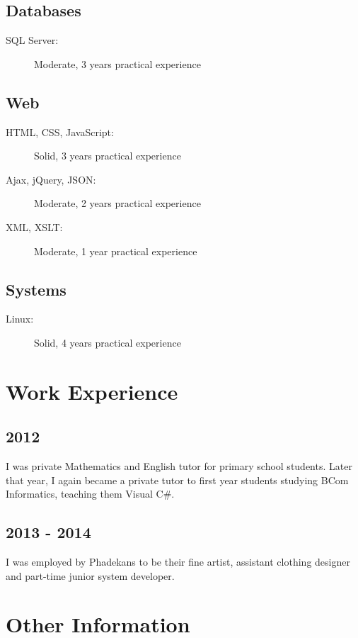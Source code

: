 	\subsection*{Databases}
		\begin{description}
			\item[SQL Server:]Moderate, 3 years practical experience
		\end{description}
	\subsection*{Web}
		\begin{description}
			\item [HTML, CSS, JavaScript:] Solid, 3 years practical experience
			\item [Ajax, jQuery, JSON:] Moderate, 2 years practical experience
			\item [XML, XSLT:] Moderate, 1 year practical experience
		\end{description}
	\subsection*{Systems}
		\begin{description}
			\item [Linux:] Solid, 4 years practical experience
		\end{description}
	


\section*{Work Experience}

	\subsection*{2012}
	I was private Mathematics and English tutor for primary school students. Later that year, I again became a private tutor to first year students studying BCom Informatics, teaching them Visual C\#.
	\subsection*{2013 - 2014}
	I was employed by Phadekans to be their fine artist, assistant clothing designer and part-time junior system developer.
		

\section*{Other Information}

